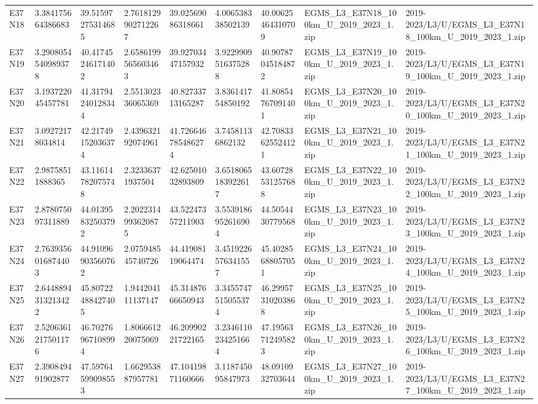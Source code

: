 \begin{landscape}
\begin{longtable}{lllllllll}
E37N18 & 3.384175664386683 & 39.51597275314685 & 2.7618129902712267 & 39.02569086318661 & 4.006538338502139 & 40.00625464310709 & EGMS\_L3\_E37N18\_100km\_U\_2019\_2023\_1.zip & 2019-2023/L3/U/EGMS\_L3\_E37N18\_100km\_U\_2019\_2023\_1.zip \\
E37N19 & 3.2908054540989378 & 40.41745246171402 & 2.6586199565603463 & 39.92703447157932 & 3.9229909516375288 & 40.90787045184872 & EGMS\_L3\_E37N19\_100km\_U\_2019\_2023\_1.zip & 2019-2023/L3/U/EGMS\_L3\_E37N19\_100km\_U\_2019\_2023\_1.zip \\
E37N20 & 3.193722045457781 & 41.31794240128344 & 2.551302336065369 & 40.82733713165287 & 3.836141754850192 & 41.80854767091401 & EGMS\_L3\_E37N20\_100km\_U\_2019\_2023\_1.zip & 2019-2023/L3/U/EGMS\_L3\_E37N20\_100km\_U\_2019\_2023\_1.zip \\
E37N21 & 3.09272178034814 & 42.21749152036374 & 2.439632192074961 & 41.726646785486274 & 3.74581136862132 & 42.70833625524121 & EGMS\_L3\_E37N21\_100km\_U\_2019\_2023\_1.zip & 2019-2023/L3/U/EGMS\_L3\_E37N21\_100km\_U\_2019\_2023\_1.zip \\
E37N22 & 2.98758511888365 & 43.11614782075748 & 2.32336371937504 & 42.62501032893809 & 3.6518065183922617 & 43.60728531257688 & EGMS\_L3\_E37N22\_100km\_U\_2019\_2023\_1.zip & 2019-2023/L3/U/EGMS\_L3\_E37N22\_100km\_U\_2019\_2023\_1.zip \\
E37N23 & 2.878075097311889 & 44.01395832503792 & 2.2022314993620875 & 43.52247357211903 & 3.5539186952616904 & 44.5054430779568 & EGMS\_L3\_E37N23\_100km\_U\_2019\_2023\_1.zip & 2019-2023/L3/U/EGMS\_L3\_E37N23\_100km\_U\_2019\_2023\_1.zip \\
E37N24 & 2.7639356016874403 & 44.91096903560762 & 2.075948545740726 & 44.41908119064474 & 3.4519226576341557 & 45.40285688057051 & EGMS\_L3\_E37N24\_100km\_U\_2019\_2023\_1.zip & 2019-2023/L3/U/EGMS\_L3\_E37N24\_100km\_U\_2019\_2023\_1.zip \\
E37N25 & 2.6448894313213422 & 45.80722488427405 & 1.944204111137147 & 45.31487666650943 & 3.3455747515055374 & 46.29957310203868 & EGMS\_L3\_E37N25\_100km\_U\_2019\_2023\_1.zip & 2019-2023/L3/U/EGMS\_L3\_E37N25\_100km\_U\_2019\_2023\_1.zip \\
E37N26 & 2.5206361217501176 & 46.70276967108994 & 1.806661220075069 & 46.20990221722165 & 3.2346110234251664 & 47.19563712495823 & EGMS\_L3\_E37N26\_100km\_U\_2019\_2023\_1.zip & 2019-2023/L3/U/EGMS\_L3\_E37N26\_100km\_U\_2019\_2023\_1.zip \\
E37N27 & 2.390849491902877 & 47.59764599098553 & 1.662953887957781 & 47.10419871160666 & 3.118745095847973 & 48.0910932703644 & EGMS\_L3\_E37N27\_100km\_U\_2019\_2023\_1.zip & 2019-2023/L3/U/EGMS\_L3\_E37N27\_100km\_U\_2019\_2023\_1.zip \\

\end{longtable}
\end{landscape}
